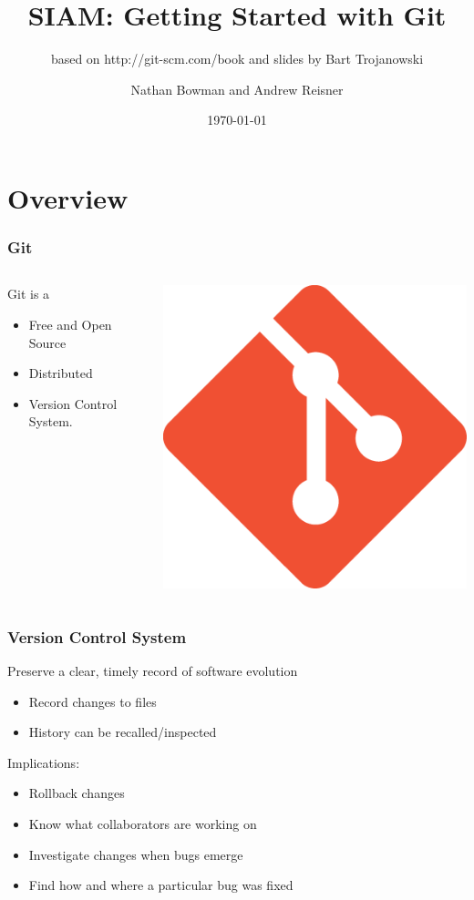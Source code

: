 \documentclass[english,compress]{beamer}
\title{SIAM: Getting Started with Git}
\subtitle{based on http://git-scm.com/book and slides by Bart Trojanowski}
\author{Nathan Bowman and Andrew Reisner}
\date{\today}
\begin{document}
\nocite{*}
\frame{\titlepage}

\section{Overview}
\frame
{
    \frametitle{Git}
    \begin{columns}
    \begin{column}{.5\textwidth}
        Git is a
        \begin{itemize}
            \item Free and Open Source
            \item Distributed
            \item Version Control System.
        \end{itemize}
    \end{column}
    \begin{column}{.5\textwidth}
        \begin{center}
            \includegraphics[width=.7\textwidth]{figs/git-logo.png} 
        \end{center}
    \end{column}
    \end{columns}
}

\frame
{
    \frametitle{Version Control System}

        Preserve a clear, timely record of software evolution
            \begin{itemize}
                \item Record changes to files
                \item History can be recalled/inspected
            \end{itemize}
        Implications:
            \begin{itemize}
                \item Rollback changes
                \item Know what collaborators are working on
                \item Investigate changes when bugs emerge
                \item Find how and where a particular bug was fixed
            \end{itemize}
}
\end{document}
